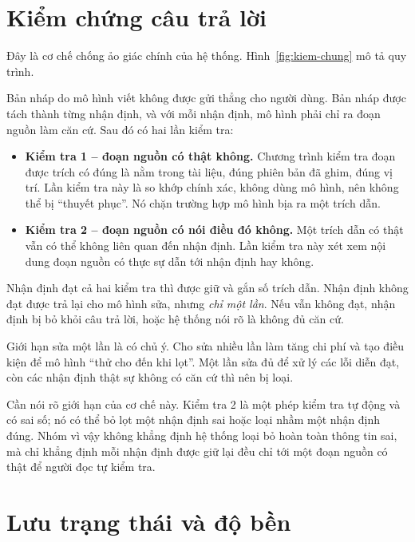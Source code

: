 \section{Kiểm chứng câu trả lời}
\label{sec:kiem-chung}

Đây là cơ chế chống ảo giác chính của hệ thống. Hình~\ref{fig:kiem-chung} mô tả quy trình.


Bản nháp do mô hình viết không được gửi thẳng cho người dùng. Bản nháp được tách thành từng nhận định, và với mỗi nhận định, mô hình phải chỉ ra đoạn nguồn làm căn cứ. Sau đó có hai lần kiểm tra:

\begin{itemize}
    \item \textbf{Kiểm tra 1 -- đoạn nguồn có thật không.} Chương trình kiểm tra đoạn được trích có đúng là nằm trong tài liệu, đúng phiên bản đã ghim, đúng vị trí. Lần kiểm tra này là so khớp chính xác, không dùng mô hình, nên không thể bị ``thuyết phục''. Nó chặn trường hợp mô hình bịa ra một trích dẫn.
    \item \textbf{Kiểm tra 2 -- đoạn nguồn có nói điều đó không.} Một trích dẫn có thật vẫn có thể không liên quan đến nhận định. Lần kiểm tra này xét xem nội dung đoạn nguồn có thực sự dẫn tới nhận định hay không.
\end{itemize}

Nhận định đạt cả hai kiểm tra thì được giữ và gắn số trích dẫn. Nhận định không đạt được trả lại cho mô hình sửa, nhưng \emph{chỉ một lần}. Nếu vẫn không đạt, nhận định bị bỏ khỏi câu trả lời, hoặc hệ thống nói rõ là không đủ căn cứ.

Giới hạn sửa một lần là có chủ ý. Cho sửa nhiều lần làm tăng chi phí và tạo điều kiện để mô hình ``thử cho đến khi lọt''. Một lần sửa đủ để xử lý các lỗi diễn đạt, còn các nhận định thật sự không có căn cứ thì nên bị loại.

Cần nói rõ giới hạn của cơ chế này. Kiểm tra 2 là một phép kiểm tra tự động và có sai số; nó có thể bỏ lọt một nhận định sai hoặc loại nhầm một nhận định đúng. Nhóm vì vậy không khẳng định hệ thống loại bỏ hoàn toàn thông tin sai, mà chỉ khẳng định mỗi nhận định được giữ lại đều chỉ tới một đoạn nguồn có thật để người đọc tự kiểm tra.

\section{Lưu trạng thái và độ bền}

